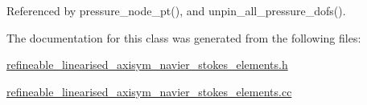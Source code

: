 Referenced by pressure\+\_\+node\+\_\+pt(), and unpin\+\_\+all\+\_\+pressure\+\_\+dofs().



The documentation for this class was generated from the following files\+:\begin{DoxyCompactItemize}
\item 
\hyperlink{refineable__linearised__axisym__navier__stokes__elements_8h}{refineable\+\_\+linearised\+\_\+axisym\+\_\+navier\+\_\+stokes\+\_\+elements.\+h}\item 
\hyperlink{refineable__linearised__axisym__navier__stokes__elements_8cc}{refineable\+\_\+linearised\+\_\+axisym\+\_\+navier\+\_\+stokes\+\_\+elements.\+cc}\end{DoxyCompactItemize}
